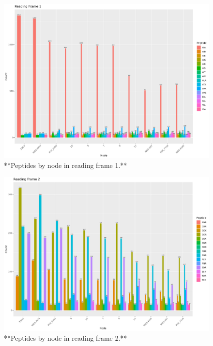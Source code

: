 \documentclass[
]{book}
\begin{document}
\begin{figure}
\includegraphics[width=1\linewidth]{figures/Peptides_RF1} \caption{**Peptides by node in reading frame 1.**}\label{fig:FIG7x}
\end{figure}

\begin{figure}
\includegraphics[width=1\linewidth]{figures/Peptides_RF2} \caption{**Peptides by node in reading frame 2.**}\label{fig:FIG8x}
\end{figure}
\end{document}
